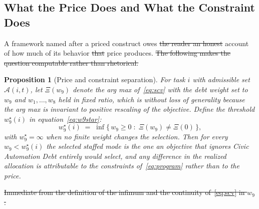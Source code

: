 \documentclass[utf8]{FrontiersinHarvard}
\newtheorem{Proposition}{Proposition}
\providecommand{\DIFadd}[1]{{\protect\color{blue}\uwave{#1}}} %
\providecommand{\DIFdel}[1]{{\protect\color{red}\sout{#1}}}                      %
\providecommand{\DIFaddbegin}{} %
\providecommand{\DIFaddend}{} %
\providecommand{\DIFdelbegin}{} %
\providecommand{\DIFdelend}{} %
\begin{document}
	\subsection{What the Price Does and What the Constraint Does}
	\label{sec:pricediag}

	A framework named after a priced construct owes \DIFdelbegin \DIFdel{the reader an honest }\DIFdelend \DIFaddbegin \DIFadd{an }\DIFaddend account of how much of its behavior \DIFdelbegin \DIFdel{that }\DIFdelend \DIFaddbegin \DIFadd{the }\DIFaddend price produces.
	\DIFdelbegin \DIFdel{The following makes the question computable rather than rhetorical.
	}\DIFdelend 

	\begin{Proposition}[Price and constraint separation]
		\label{prop:price}
		For task $i$ with admissible set $\mathcal{A}(i,t)$, let $\Xi(w_9)$ denote the arg max of~\eqref{eq:scv} with the debt weight set to $w_9$ and $w_1,\ldots,w_8$ held in fixed ratio, which is without loss of generality because the arg max is invariant to positive rescaling of the objective. Define the threshold $w_9^\star(i)$ in equation~\eqref{eq:w9star}:
		\begin{equation}
			w_9^\star(i) \;=\; \inf\{\,w_9 \geq 0 \;:\; \Xi(w_9) \neq \Xi(0)\,\},
			\label{eq:w9star}
		\end{equation}
		with $w_9^\star=\infty$ when no finite weight changes the selection. Then for every $w_9 < w_9^\star(i)$ the selected staffed mode is the one an objective that ignores Civic Automation Debt entirely would select, and any difference in the realized allocation is attributable to the constraints of~\eqref{eq:program} rather than to the price.
	\end{Proposition}

	\DIFdelbegin %
\DIFdel{Immediate from the definition of the infimum and the continuity of~\eqref{eq:scv} in $w_9$.
	}%
\end{document}
